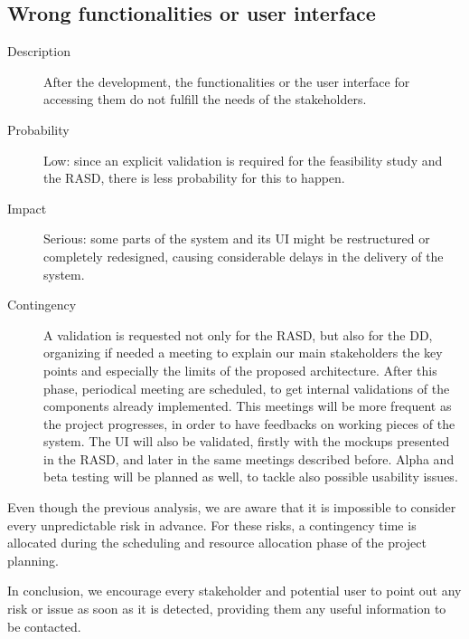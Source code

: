 \subsection*{Wrong functionalities or user interface}
	\begin{description}
		\item[Description] After the development, the functionalities or the user interface for accessing them do not fulfill the needs of the stakeholders.
		\item[Probability] Low: since an explicit validation is required for the feasibility study and the RASD, there is less probability for this to happen.
		\item[Impact] Serious: some parts of the system and its UI might be restructured or completely redesigned, causing considerable delays in the delivery of the system.
		\item[Contingency] A validation is requested not only for the RASD, but also for the DD, organizing if needed a meeting to explain our main stakeholders the key points and especially the limits of the proposed architecture. After this phase, periodical meeting are scheduled, to get internal validations of the components already implemented. This meetings will be more frequent as the project progresses, in order to have feedbacks on working pieces of the system.\newline
		The UI will also be validated, firstly with the mockups presented in the RASD, and later in the same meetings described before.\newline
		Alpha and beta testing will be planned as well, to tackle also possible usability issues.
	\end{description}

Even though the previous analysis, we are aware that it is impossible to consider every unpredictable risk in advance. For these risks, a contingency time is allocated during the scheduling and resource allocation phase of the project planning.

In conclusion, we encourage every stakeholder and potential user to point out any risk or issue as soon as it is detected, providing them any useful information to be contacted.

